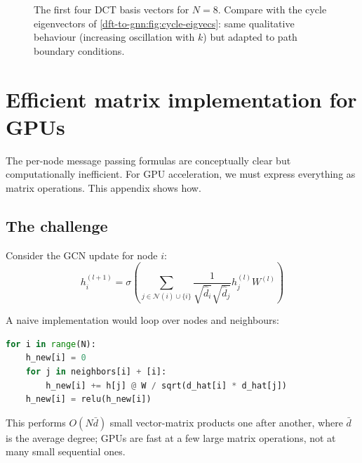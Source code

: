 \begin{notechapter}
\begin{figure}[H]
\caption{The first four DCT basis vectors for $N=8$. Compare with
         the cycle eigenvectors of \cref{dft-to-gnn:fig:cycle-eigvecs}: same qualitative behaviour (increasing oscillation
         with $k$) but adapted to path boundary conditions.}
\end{figure}

\section{Efficient matrix implementation for GPUs}
\label{dft-to-gnn:app:matrix-implementation}

The per-node message passing formulas are conceptually clear but
computationally inefficient. For GPU acceleration, we must express
everything as matrix operations. This appendix shows how.

\subsection{The challenge}

Consider the GCN update for node $i$:
\[
h_i^{(l+1)} = \sigma\left( \sum_{j \in \mathcal{N}(i) \cup \{i\}}
    \frac{1}{\sqrt{\hat{d}_i}\sqrt{\hat{d}_j}} h_j^{(l)} W^{(l)} \right)
\]

A naive implementation would loop over nodes and neighbours:
\begin{lstlisting}[language=Python]
for i in range(N):
    h_new[i] = 0
    for j in neighbors[i] + [i]:
        h_new[i] += h[j] @ W / sqrt(d_hat[i] * d_hat[j])
    h_new[i] = relu(h_new[i])
\end{lstlisting}

This performs $O(N\bar d)$ small vector-matrix products one after another, where $\bar d$ is the average degree; GPUs are fast at a few large matrix operations, not at many small sequential ones.


\end{notechapter}
